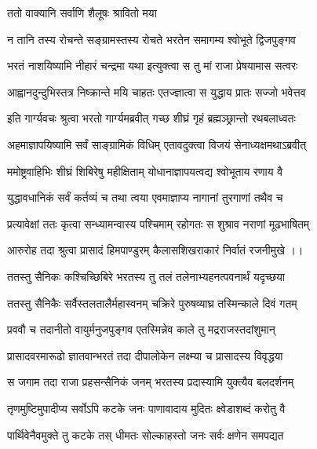 
\onelineshloka
{ततो वाक्यानि सर्वाणि शैलूषः श्रावितो मया}%

\twolineshloka
{न तानि तस्य रोचन्ते सङ्ग्रामस्तस्य रोचते}
{भरतेन समागम्य श्वोभूते द्विजपुङ्गव}%

\twolineshloka
{भरतं नाशयिष्यामि नीहारं चन्द्रमा यथा}
{इत्युक्त्वा स तु मां राजा प्रेषयामास सत्वरः}%

\twolineshloka
{आह्वानदुन्दुभिस्तत्र निष्क्रान्ते मयि चाहतः}
{एतज्ज्ञात्वा स युद्धाय प्रातः सज्जो भवेत्तव}%


\twolineshloka
{इति गार्ग्यवचः श्रुत्वा भरतो गार्ग्यमब्रवीत्}
{गच्छ शीघ्रं गृहं ब्रह्मञ्छ्रान्तो रथबलाध्वतः}%

\twolineshloka
{अहमाज्ञापयिष्यामि सर्वं साङ्ग्रामिकं विधिम्}
{एतावदुक्त्वा विजयं सेनाध्यक्षमथाऽब्रवीत्}%

\twolineshloka
{ममोष्ट्रवाहिभिः शीघ्रं शिबिरेषु महीक्षिताम्}
{योधानाज्ञापयत्वद्य श्वोभूताय रणाय वै} %

\twolineshloka
{युद्धावधानिकं सर्वं कर्तव्यं च तथा त्वया}
{एवमाज्ञाप्य नागानां तुरगाणां तथैव च}%

\twolineshloka
{प्रत्यावेक्षां ततः कृत्वा सन्ध्यामन्वास्य पश्चिमाम्}
{रहोगतः स शुश्राव नराणां मूढभाषितम्}%

\twolineshloka
{आरुरोह तदा श्रुत्वा प्रासादं हिमपाण्डुरम्}
{कैलासशिखराकारं निर्वातं रजनीमुखे ।।}%

\twolineshloka
{ततस्तु सैनिकः कश्चिच्छिबिरे भरतस्य तु}
{तलं तलेनाभ्यहनत्पवनार्थं यदृच्छया}%

\twolineshloka
{ततस्तु सैनिकैः सर्वैस्तलतालैर्महास्वनम्}
{चक्रिरे पुरुषव्याघ्र तस्मिन्काले दिवं गतम्}%

\twolineshloka
{प्रववौ च तदानीतो वायुर्मनुजपुङ्गव}
{एतस्मिन्नेव काले तु मद्रराजस्तदांशुमान्}%

\twolineshloka
{प्रासादवरमारूढो ज्ञातवान्भरतं तदा}
{दीपालोकेन लक्ष्म्या च प्रासादस्य विवृद्धया}%

\twolineshloka
{स जगाम तदा राजा प्रहसन्सैनिकं जनम्}
{भरतस्य प्रदास्यामि युक्त्यैव बलदर्शनम्}%

\twolineshloka
{तृणमुष्टिमुपादीप्य सर्वोऽपि कटके जनः}
{पाणावादाय मुदितः क्ष्वेडाशब्दं करोतु वै}%

\twolineshloka
{पार्थिवेनैवमुक्ते तु कटके तस् धीमतः}
{सोल्काहस्तो जनः सर्वः क्षणेन समपद्यत} %

